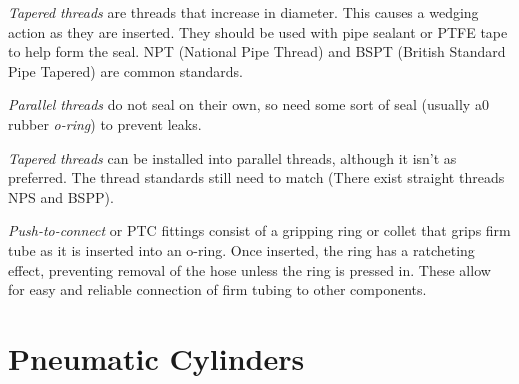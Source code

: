\documentclass[10pt,letterpaper]{book}
\begin{document}
\begin{asparaenum}[a)]
	\item  \textit{Tapered threads} are threads that increase in diameter. This causes a wedging action as they are inserted. They should be used with pipe sealant or PTFE tape to help form the seal. NPT (National Pipe Thread) and BSPT (British Standard Pipe Tapered) are common standards.
	\item \textit{Parallel threads} do not seal on their own, so need some sort of seal (usually a0 rubber \textit{o-ring}) to prevent leaks.
	\item \textit{Tapered threads} can be installed into parallel threads, although it isn't as preferred. The thread standards still need to match (There exist straight threads NPS and BSPP).
	\item \textit{Push-to-connect} or PTC fittings consist of a gripping ring or collet that grips firm tube as it is inserted into an o-ring. Once inserted, the ring has a ratcheting effect, preventing removal of the hose unless the ring is pressed in. These allow for easy and reliable connection of firm tubing to other components.	
\end{asparaenum}

\section{Pneumatic Cylinders}
\end{document}
